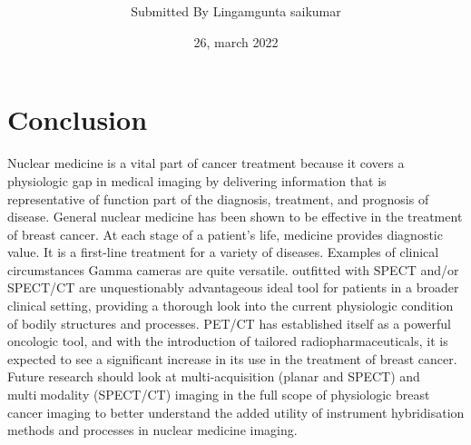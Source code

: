 \documentclass{article}
\title{ }
\author{Submitted By Lingamgunta saikumar}
\date{26, march 2022}
\begin{document}
\maketitle

\section{Conclusion}
Nuclear medicine is a vital part of cancer treatment because it covers a physiologic gap in medical 
imaging by delivering information that is representative of function part of the diagnosis, treatment, 
and prognosis of disease.
General nuclear medicine has been shown to be effective in the treatment of breast cancer. At each 
stage of a patient's life, medicine provides diagnostic value. It is a first-line treatment for a variety of 
diseases. Examples of clinical circumstances Gamma cameras are quite versatile. outfitted with 
SPECT and/or SPECT/CT are unquestionably advantageous ideal tool for patients in a broader clinical 
setting, providing a thorough look into the current physiologic condition of bodily structures and 
processes. PET/CT has established itself as a powerful oncologic tool, and with the introduction of 
tailored radiopharmaceuticals, it is expected to see a significant increase in its use in the treatment 
of breast cancer. Future research should look at multi-acquisition (planar and SPECT) and multimodality (SPECT/CT) imaging in the full scope of physiologic breast cancer imaging to better 
understand the added utility of instrument hybridisation methods and processes in nuclear medicine 
imaging.
\end{document}
